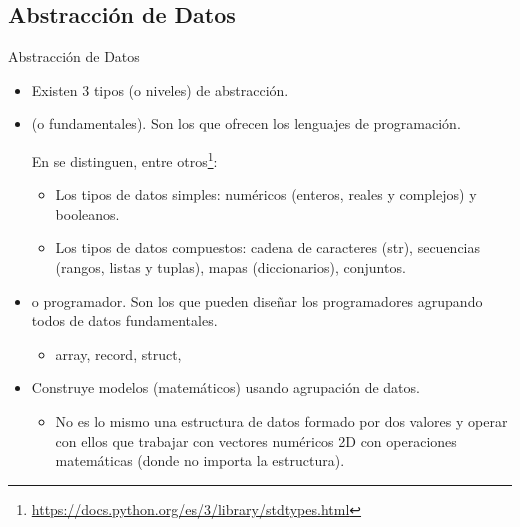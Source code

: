 \documentclass[10pt,envcountsect,spanish]{beamer}
\begin{document}
\subsection{Abstracción de Datos}
\begin{frame}{Abstracción de Datos}
\begin{itemize}%
\item Existen 3 tipos (o niveles) de abstracción.
\item {}  (o fundamentales). Son los que ofrecen los lenguajes de programación.

 En  se distinguen, entre otros\footnote[frame]{\url{https://docs.python.org/es/3/library/stdtypes.html}}:
\begin{itemize}
\item Los tipos de datos simples: numéricos (enteros, reales y complejos) y booleanos.
\item Los tipos de datos compuestos: cadena de caracteres (str), secuencias (rangos, listas y tuplas), mapas (diccionarios), conjuntos.
\end{itemize}


\item {} o programador. Son los que pueden diseñar los programadores agrupando todos de datos fundamentales. 

\begin{itemize}
\item array, record, struct, 
\end{itemize}

\item {} Construye modelos (matemáticos) usando agrupación de datos.

\begin{itemize}
\item No es lo mismo una estructura de datos formado por dos valores y operar con ellos que trabajar con vectores numéricos 2D con operaciones matemáticas (donde no importa la estructura).
\end{itemize}

\end{itemize}

\end{frame}
\end{document}
